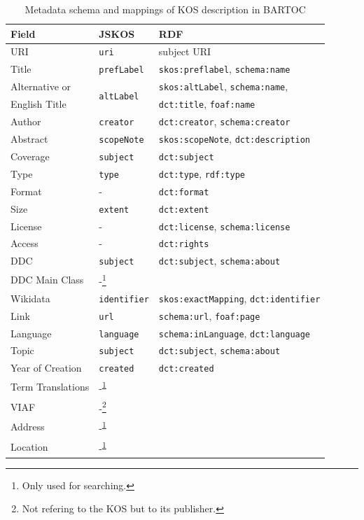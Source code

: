 \documentclass[12pt,a4paper]{llncs}
\begin{document}
\begin{table}\centering
\caption{Metadata schema and mappings of KOS description in BARTOC}
\label{table:fields}
\begin{tabular}{lll}
Field & JSKOS & RDF \\
\hline	
URI      & \verb|uri|       & subject URI \\
Title    & \verb|prefLabel| & \verb|skos:preflabel|, \verb|schema:name| \\
Alternative or &
\multirow{2}{*}{\texttt{altLabel}} 
 							& \verb|skos:altLabel|, \verb|schema:name|, \\
English Title               & & \verb|dct:title|, \verb|foaf:name| \\
Author   & \verb|creator|   & \verb|dct:creator|, \verb|schema:creator| \\
Abstract & \verb|scopeNote| & \verb|skos:scopeNote|, \verb|dct:description| \\
Coverage & \verb|subject|   & \verb|dct:subject| \\
Type     & \verb|type|      & \verb|dct:type|, \verb|rdf:type| \\
Format   & -				&  \verb|dct:format| \\
Size     & \verb|extent|    & \verb|dct:extent| \\
License  & -                & \verb|dct:license|, \verb|schema:license| \\ 
Access   & - 				& \verb|dct:rights| \\
DDC      & \verb|subject|   & \verb|dct:subject|, \verb|schema:about| \\
DDC Main Class & -\footnote{\label{fn:s}Only used for searching.} \\
Wikidata & \verb|identifier| & \verb|skos:exactMapping|, \verb|dct:identifier| \\
Link     & \verb|url|       & \verb|schema:url|, \verb|foaf:page| \\
Language & \verb|language|  & \verb|schema:inLanguage|, \verb|dct:language| \\
Topic    & \verb|subject| & \verb|dct:subject|, \verb|schema:about| \\
Year of Creation & \verb|created| & \verb|dct:created| \\
Term Translations  & -\textsuperscript{\ref{fn:s}} \\
VIAF & -\footnote{\label{fn:p}Not refering to the KOS but to its publisher.} \\
Address & -\textsuperscript{\ref{fn:p}} \\
Location & -\textsuperscript{\ref{fn:p}} \\
\hline
\end{tabular}
\vspace{-7mm}
\end{table}
\end{document}
